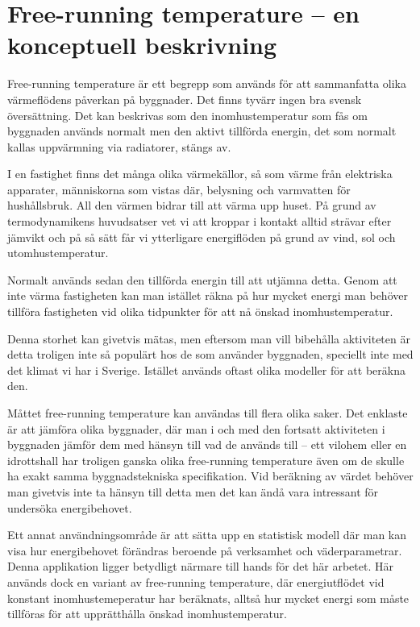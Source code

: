 \section{Free-running temperature – en konceptuell beskrivning}
\label{sec:freerunningtemp}

Free-running temperature är ett begrepp som används för att sammanfatta olika 
värmeflödens påverkan på byggnader. Det finns tyvärr ingen bra svensk översättning. Det kan beskrivas som den inomhustemperatur som fås om byggnaden används 
normalt men den aktivt tillförda energin, det som normalt kallas uppvärmning via radiatorer, stängs av.

I en fastighet finns det många olika värmekällor, så som värme från elektriska apparater, 
människorna som vistas där, belysning och varmvatten för hushållsbruk. All den värmen
 bidrar till att värma upp huset. På grund av termodynamikens huvudsatser vet vi att 
 kroppar i kontakt alltid strävar efter jämvikt och på så sätt får vi ytterligare energiflöden på 
 grund av vind, sol och utomhustemperatur.

Normalt används sedan den tillförda energin till att utjämna detta. Genom att inte värma 
fastigheten kan man istället räkna på hur mycket energi man behöver tillföra fastigheten 
vid olika tidpunkter för att nå önskad inomhustemperatur.

Denna storhet kan givetvis mätas, men eftersom man vill bibehålla aktiviteten är detta troligen inte så populärt hos de som använder byggnaden, speciellt inte med det klimat vi har i Sverige. Istället används oftast olika modeller för att beräkna den.

Måttet free-running temperature kan användas till flera olika saker. Det enklaste är att 
jämföra olika byggnader, där man i och med den fortsatt aktiviteten i byggnaden jämför
 dem med hänsyn till vad de används till – ett vilohem eller en idrottshall har troligen 
 ganska olika free-running temperature även om de skulle ha exakt samma 
 byggnadstekniska specifikation. Vid beräkning av värdet behöver man givetvis inte ta 
 hänsyn till detta men det kan ändå vara intressant för undersöka energibehovet.

Ett annat användningsområde är att sätta upp en statistisk modell där man kan visa hur 
energibehovet förändras beroende på verksamhet och väderparametrar. Denna applikation ligger betydligt närmare till hands för det här arbetet. Här används dock en variant av free-running temperature, där energiutflödet vid konstant inomhustemeperatur har beräknats, alltså hur mycket energi som måste tillföras för att upprätthålla önskad inomhustemperatur.
